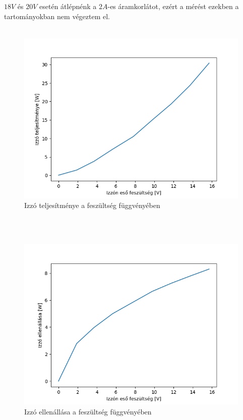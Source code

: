 \documentclass[10pt,a4paper]{article}
\begin{document}
$18V$ és $20V$ esetén átlépnénk a $2A$-es áramkorlátot, ezért a mérést ezekben a tartományokban nem végeztem el. \\\\
\begin{figure}[hbtp]
			 \centering
			 \includegraphics[scale=0.7]{telj_fesz.png}
			 \caption{Izzó teljesítménye a feszültség függvényében}
			 \end{figure}\\\\
			 \begin{figure}[hbtp]
			 \centering
			 \includegraphics[scale=0.7]{ell_fesz.png}
			 \caption{Izzó ellenállása a feszültség függvényében}
\end{figure}
\end{document}
